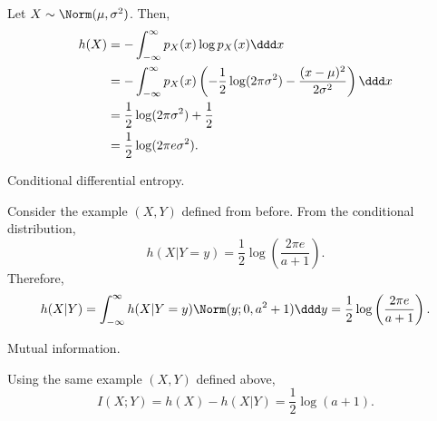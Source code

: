 Let $X\sim \Norm(\mu, \sigma^2)$. Then,
\begin{align*}
	h(X) &= -\int_{-\infty}^{\infty}p_X(x)\log p_X(x) \ddd x\\
			 &= -\int_{-\infty}^{\infty}p_X(x)\left(-\frac{1}{2}\log(2\pi\sigma^2)-\frac{(x-\mu)^2}{2\sigma^2}\right)\ddd x \\
			 &= \frac{1}{2}\log(2\pi\sigma^2) + \frac{1}{2} \\
			 &= \frac{1}{2}\log(2\pi e\sigma^2).
\end{align*}

\begin{example}
\exlabel

Conditional differential entropy.
\end{example}

\noindent Consider the example $(X,Y)$ defined from before. From the conditional distribution, 
\[h(X|Y=y) = \frac{1}{2}\log\left(\frac{2\pi e}{a+1}\right).\] 
Therefore, 
\[h(X|Y) = \int_{-\infty}^{\infty}h(X|Y=y)\Norm(y;0,a^2+1)\ddd y = \frac{1}{2} \log \left(\frac{2\pi e}{a+1}\right).\] 

\begin{example}
\exlabel

Mutual information.
\end{example}

\noindent Using the same example $(X,Y)$ defined above,
\[I(X;Y) = h(X) - h(X|Y) = \frac{1}{2}\log(a+1).\] 
